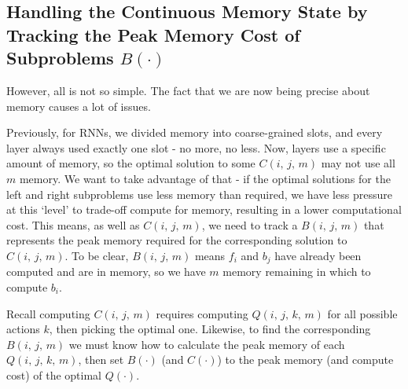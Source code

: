 \subsection{Handling the Continuous Memory State by Tracking the Peak Memory Cost of Subproblems \texorpdfstring{\(B(\cdot)\)}{\textit{B()}}}
However, all is not so simple.
The fact that we are now being precise about memory causes a lot of issues.

Previously, for RNNs, we divided memory into coarse-grained slots, and every layer always used exactly one slot - no more, no less.
Now, layers use a specific amount of memory, so the optimal solution to some \(C(i,\,j,\,m)\) may not use all \(m\) memory.
We want to take advantage of that - if the optimal solutions for the left and right subproblems use less memory than required, we have less pressure at this `level' to trade-off compute for memory, resulting in a lower computational cost.
This means, as well as \(C(i,\,j,\,m)\), we need to track a \(B(i,\,j,\,m)\) that represents the peak memory required for the corresponding solution to \(C(i,\,j,\,m)\).
To be clear, \(B(i,\,j,\,m)\) means \(f_i\) and \(b_j\) have already been computed and are in memory, so we have \(m\) memory remaining in which to compute \(b_i\).

Recall computing \(C(i,\,j,\,m)\) requires computing \(Q(i,\,j,\,k,\,m)\) for all possible actions \(k\), then picking the optimal one.
Likewise, to find the corresponding \(B(i,\,j,\,m)\) we must know how to calculate the peak memory of each \(Q(i,\,j,\,k,\,m)\), then set \(B(\cdot)\) (and \(C(\cdot)\)) to the peak memory (and compute cost) of the optimal \(Q(\cdot)\).

